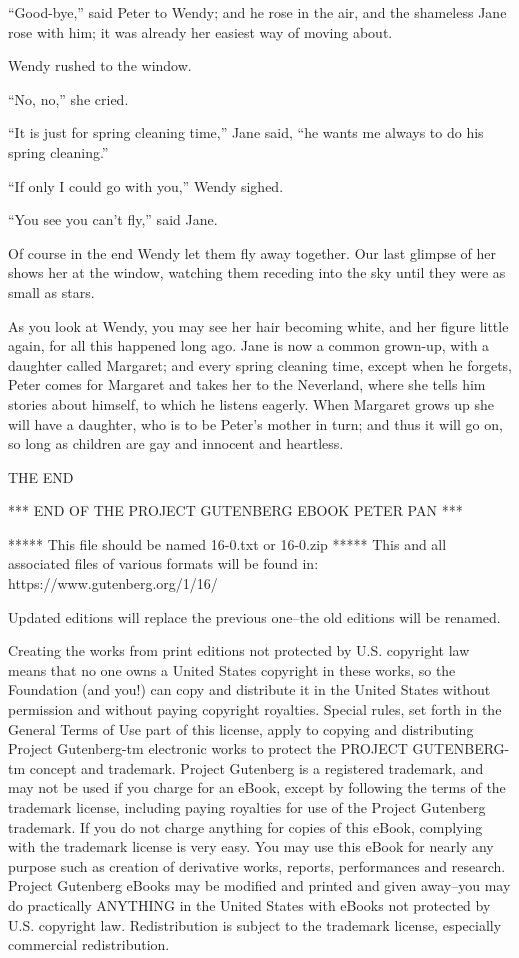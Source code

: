 ``Good-bye,'' said Peter to Wendy; and he rose in the air, and the
shameless Jane rose with him; it was already her easiest way of moving
about.

Wendy rushed to the window.

``No, no,'' she cried.

``It is just for spring cleaning time,'' Jane said, ``he wants me always
to do his spring cleaning.''

``If only I could go with you,'' Wendy sighed.

``You see you can't fly,'' said Jane.

Of course in the end Wendy let them fly away together. Our last glimpse
of her shows her at the window, watching them receding into the sky
until they were as small as stars.

As you look at Wendy, you may see her hair becoming white, and her
figure little again, for all this happened long ago. Jane is now a
common grown-up, with a daughter called Margaret; and every spring
cleaning time, except when he forgets, Peter comes for Margaret and
takes her to the Neverland, where she tells him stories about himself,
to which he listens eagerly. When Margaret grows up she will have a
daughter, who is to be Peter's mother in turn; and thus it will go on,
so long as children are gay and innocent and heartless.

THE END




*** END OF THE PROJECT GUTENBERG EBOOK PETER PAN ***

***** This file should be named 16-0.txt or 16-0.zip *****
This and all associated files of various formats will be found in:
    https://www.gutenberg.org/1/16/

Updated editions will replace the previous one--the old editions will
be renamed.

Creating the works from print editions not protected by U.S. copyright
law means that no one owns a United States copyright in these works,
so the Foundation (and you!) can copy and distribute it in the
United States without permission and without paying copyright
royalties. Special rules, set forth in the General Terms of Use part
of this license, apply to copying and distributing Project
Gutenberg-tm electronic works to protect the PROJECT GUTENBERG-tm
concept and trademark. Project Gutenberg is a registered trademark,
and may not be used if you charge for an eBook, except by following
the terms of the trademark license, including paying royalties for use
of the Project Gutenberg trademark. If you do not charge anything for
copies of this eBook, complying with the trademark license is very
easy. You may use this eBook for nearly any purpose such as creation
of derivative works, reports, performances and research. Project
Gutenberg eBooks may be modified and printed and given away--you may
do practically ANYTHING in the United States with eBooks not protected
by U.S. copyright law. Redistribution is subject to the trademark
license, especially commercial redistribution.

